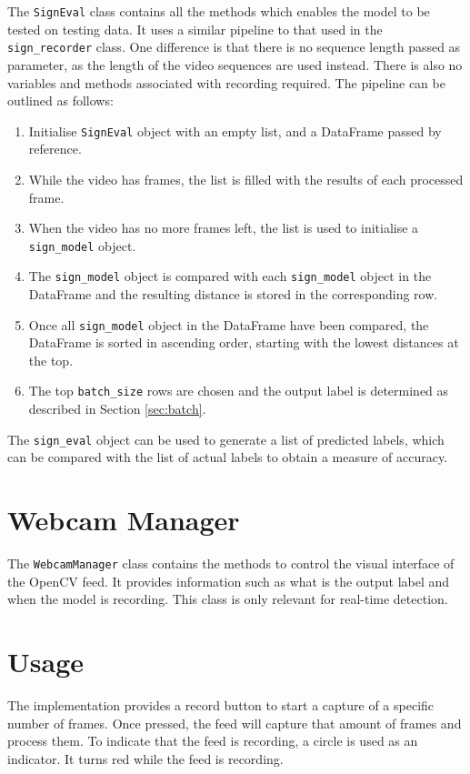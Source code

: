 \documentclass[final,rdr32.tex]{subfiles}
\begin{document}
The \verb|SignEval| class contains all the methods which enables the model to be tested on testing data. It uses a similar pipeline to that used in the \verb|sign_recorder| class. One difference is that there is no sequence length passed as parameter, as the length of the video sequences are used instead. There is also no variables and methods associated with recording required. The pipeline can be outlined as follows:

\begin{enumerate}
    \item Initialise \verb|SignEval| object with an empty list, and a DataFrame passed by reference.
    \item While the video has frames, the list is filled with the results of each processed frame.
    \item When the video has no more frames left, the list is used to initialise a  \verb|sign_model| object.
    \item The \verb|sign_model| object is compared with each \verb|sign_model| object in the DataFrame and the resulting distance is stored in the corresponding row.
    \item Once all \verb|sign_model| object in the DataFrame have been compared, the DataFrame is sorted in ascending order, starting with the lowest distances at the top.
    \item The top \verb|batch_size| rows are chosen and the output label is determined as described in Section \ref{sec:batch}.
\end{enumerate}

The \verb|sign_eval| object can be used to generate a list of predicted labels, which can be compared with the list of actual labels to obtain a measure of accuracy.


\section{Webcam Manager}
\label{sec:webcam}

The \verb|WebcamManager| class contains the methods to control the visual interface of the OpenCV feed. It provides information such as what is the output label and when the model is recording. This class is only relevant for real-time detection.

\section{Usage}

The implementation provides a record button to start a capture of a specific number of frames. Once pressed, the feed will capture that amount of frames and process them. To indicate that the feed is recording, a circle is used as an indicator. It turns red while the feed is recording.
\end{document}
